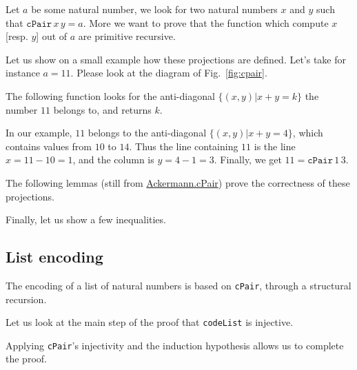       Let $a$ be some natural number, we look for two natural numbers $x$ and $y$ such that $\texttt{cPair}\,x\,y=a$. More we want to prove that the function which compute $x$ [resp. $y$] out of $a$ are primitive recursive.

      Let us show on a small example how these projections are defined. Let's take for instance $a=11$. Please look at the diagram of Fig.~\ref{fig:cpair}.

      The following function looks for the anti-diagonal $\{(x,y)|x+y=k\}$ the number $11$ belongs to, and returns $k$.

      
      In our example, $11$ belongs to the anti-diagonal $\{(x,y)|x+y=4\}$, which contains values from $10$ to $14$.
      Thus the line containing $11$ is the line $x=11-10=1$, and the column is $y=4-1= 3$. Finally, we get  $11=\texttt{cPair}\,1\,3$.


       The following lemmas (still from \href{../theories/html/hydras.Ackermann.cPair.html}{Ackermann.cPair}) prove the correctness of these projections.

       
       Finally, let us show a few inequalities.


       \subsection{List encoding}

       The encoding of a list of natural numbers is based
       on \texttt{cPair}, through a structural recursion.

         

      
       Let us look at the main step of the proof that \texttt{codeList} is injective.
       

  Applying \texttt{cPair}'s injectivity  and the induction hypothesis allows us to complete the proof.


